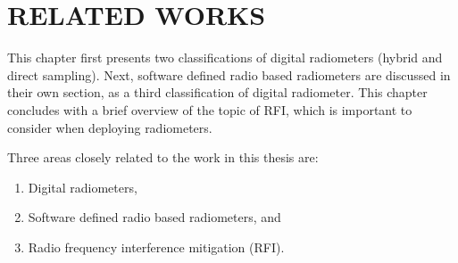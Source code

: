 

\chapter{RELATED WORKS}\label{ch:relatedworks}

This chapter first presents two classifications of digital radiometers (hybrid and direct sampling).  Next, software defined radio based radiometers are discussed in their own section, as a third classification of digital radiometer.  This chapter concludes with a brief overview of the topic of RFI, which is important to consider when deploying radiometers.

Three areas closely related to the work in this thesis are:

\begin{enumerate}
\item Digital radiometers,
\item Software defined radio based radiometers, and
\item Radio frequency interference mitigation (RFI).
\end{enumerate} 


